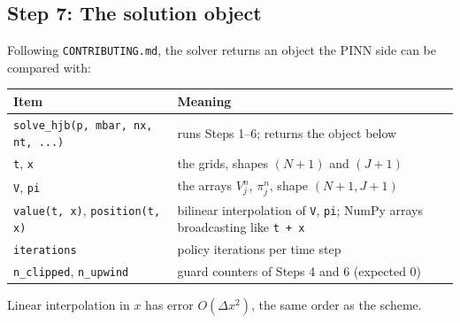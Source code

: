 \documentclass[11pt]{article}
\begin{document}
\subsection*{Step 7: The solution object}
Following \texttt{CONTRIBUTING.md}, the solver returns an object the PINN side can be
compared with:
\begin{center}
\small
\begin{tabular}{@{}lp{}@{}}
\toprule
Item & Meaning \\
\midrule
\texttt{solve\_hjb(p, mbar, nx, nt, ...)} & runs Steps 1--6; returns the object below \\
\texttt{t}, \texttt{x} & the grids, shapes $(N+1)$ and $(J+1)$ \\
\texttt{V}, \texttt{pi} & the arrays $V_j^n$, $\pi_j^n$, shape $(N+1,J+1)$ \\
\texttt{value(t, x)}, \texttt{position(t, x)} & bilinear interpolation of \texttt{V}, \texttt{pi};
  NumPy arrays broadcasting like \texttt{t + x} \\
\texttt{iterations} & policy iterations per time step \\
\texttt{n\_clipped}, \texttt{n\_upwind} & guard counters of Steps 4 and 6 (expected 0) \\
\bottomrule
\end{tabular}
\end{center}
Linear interpolation in $x$ has error $O(\Delta x^2)$, the same order as the scheme.
\end{document}
